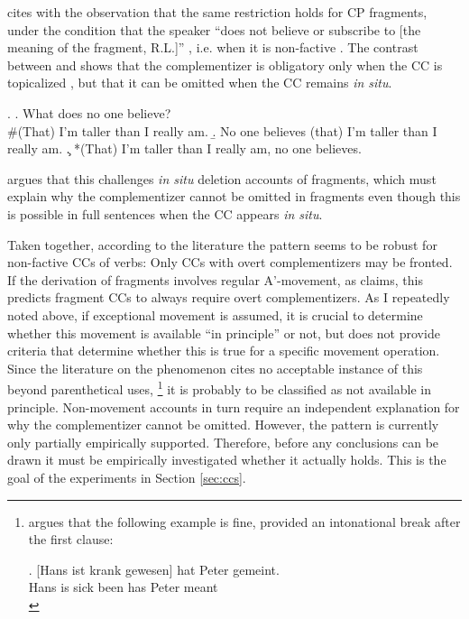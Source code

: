 \citet{merchant2004} cites \citet{morgan1973} with the observation that the same restriction holds for CP fragments, under the condition that the speaker ``does not believe or subscribe to [the meaning of the fragment, R.L.]'' \citep[690]{merchant2004}, i.e. when it is non-factive \Next[a]. The contrast between \Next[b] and \Next[c] shows that the complementizer is obligatory only when the CC is topicalized \Next[c], but that it can be omitted when the CC remains \textit{in situ}. 

\ex.
\a. What does no one believe? \hfill \citep[690]{merchant2004}\\
\mbox{}\hspace{-.45em}\#(That) I’m taller than I really am.
\b. No one believes (that) I'm taller than I really am. \label{ex:merchant-cc-insitu}
\c. *(That) I’m taller than I really am, no one believes. \label{ex:merchant-cc-fronted}

\begin{sloppypar}\noindent
\citeauthor{merchant2004} argues that this challenges \textit{in situ} deletion accounts of fragments, which must explain why the complementizer cannot be omitted in fragments even though this is possible in full sentences when the CC appears \textit{in situ}.\end{sloppypar}

Taken together, according to the literature the pattern seems to be robust for non-factive CCs of verbs: Only CCs with overt complementizers may be fronted. If the derivation of fragments involves regular A'-movement, as \citet{merchant2004} claims, this predicts fragment CCs to always require overt complementizers. As I repeatedly noted above, if exceptional movement is assumed, it is crucial to determine whether this movement is available ``in principle'' or not, but \citet{weir2014} does not provide criteria that determine whether this is true for a specific movement operation. Since the literature on the phenomenon cites no acceptable instance of this beyond parenthetical uses,%
\footnote{\citet{webelhuth1992} argues that the following example is fine, provided an intonational break after the first clause:

\exg. [Hans ist krank gewesen] hat Peter gemeint.\\
Hans is sick been has Peter meant\\
 

}\afterfn%
%
it is probably to be classified as not available in principle. Non-movement accounts in turn require an independent explanation for why the complementizer cannot be omitted. However, the pattern is currently only partially empirically supported. Therefore, before any conclusions can be drawn it must be empirically investigated whether it actually holds. This is the goal of the experiments in Section \ref{sec:ccs}. 

